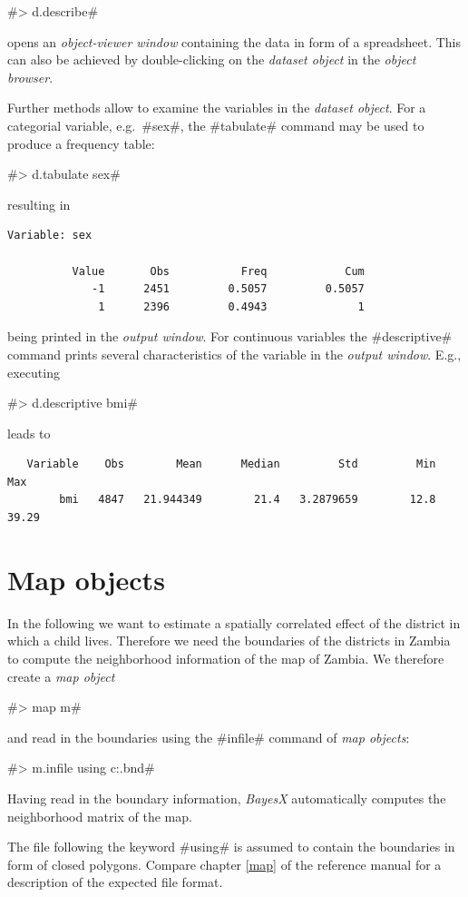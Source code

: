 \documentclass[11pt,a4paper,twoside]{bayesxreport}
\begin{document}
#> d.describe#

opens an {\it object-viewer window} containing the data in form of a
spreadsheet. This can also be achieved by double-clicking on the
{\it dataset object} in the {\it object browser}.

Further methods allow to examine the variables in the {\it dataset
object}. For a categorial variable, e.g.~#sex#, the #tabulate#
command may be used to produce a frequency table:

#> d.tabulate sex#

resulting in

\begin{verbatim}
Variable: sex

          Value       Obs           Freq            Cum
             -1      2451         0.5057         0.5057
              1      2396         0.4943              1
\end{verbatim}

being printed in the {\it output window}. For continuous variables
the #descriptive# command prints several characteristics of the
variable in the {\em output window}. E.g., executing

#> d.descriptive bmi#

leads to

\begin{verbatim}
   Variable    Obs        Mean      Median         Std         Min         Max
        bmi   4847   21.944349        21.4   3.2879659        12.8       39.29
\end{verbatim}

\section{Map objects}\label{zambia_step_maps}

In the following we want to estimate a spatially correlated effect
of the district in which a child lives. Therefore we need the
boundaries of the districts in Zambia to compute the neighborhood
information of the map of Zambia. We therefore create a {\it map
object}

#> map m#

and read in the boundaries using the #infile# command of {\it map
objects}:

#> m.infile using c:\data\zambia.bnd#

Having read in the boundary information, {\it BayesX} automatically
computes the neighborhood matrix of the map.

The file following the keyword #using# is assumed to contain the
boundaries in form of closed polygons. Compare chapter \ref*{map} of
the reference manual for a description of the expected file format.
\end{document}
